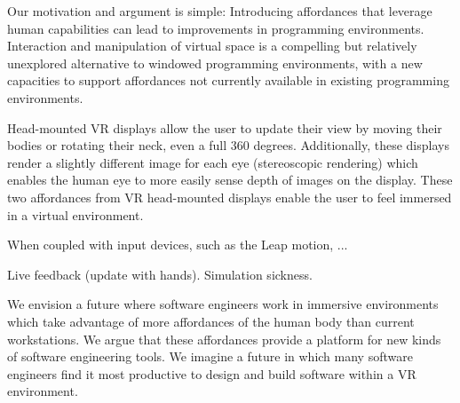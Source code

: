 \documentclass[conference]{IEEEtran}
\begin{document}

Our motivation and argument is simple: 
Introducing affordances that leverage human capabilities can lead to improvements in programming environments.
Interaction and manipulation of virtual space is a compelling but relatively unexplored alternative to windowed programming environments, with a new capacities to support affordances not currently available in existing programming environments.

Head-mounted VR displays allow the user to update their view by moving their bodies or rotating their neck, even a full 360 degrees.
Additionally, these displays render a slightly different image for each eye (stereoscopic rendering) which enables the human eye to more easily sense depth of images on the display.
These two affordances from VR head-mounted displays enable the user to feel immersed in a virtual environment.

When coupled with input devices, such as the Leap motion, ...

Live feedback (update with hands).  Simulation sickness.

We envision a future where software engineers work in immersive environments which take advantage of more affordances of the human body than current workstations.
We argue that these affordances provide a platform for new kinds of software engineering tools. 
We imagine a future in which many software engineers find it most productive to design and build software within a VR environment. 






\end{document}
